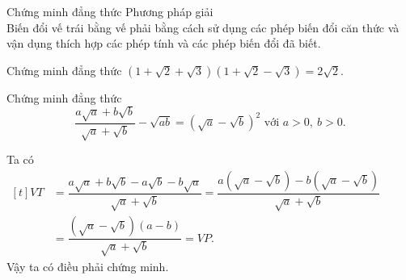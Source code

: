 \begin{dang}{Chứng minh đẳng thức}
    Phương pháp giải\\
   Biến đổi vế trái bằng vế phải bằng cách sử dụng các phép biến đổi căn thức và vận dụng thích hợp các phép tính và các phép biến đổi đã biết.
\end{dang}
\begin{vd}
	Chứng minh đẳng thức $ \left(1+ \sqrt2 + \sqrt 3\right)\left(1+ \sqrt 2 - \sqrt 3\right) = 2\sqrt2. $
\end{vd}
\begin{vd} Chứng minh đẳng thức
	$$\dfrac{a\sqrt a + b\sqrt b}{\sqrt a + \sqrt b} - \sqrt{ab} = (\sqrt a - \sqrt b)^2 \text{ với } a> 0,\ b> 0.$$
	
\end{vd}
\loigiai
	{
		Ta có 
		$\begin{aligned}[t] VT  &= \dfrac{a\sqrt a + b\sqrt b - a\sqrt b - b\sqrt a}{\sqrt a + \sqrt b} = \dfrac{a(\sqrt a - \sqrt b) -b (\sqrt a - \sqrt b)}{\sqrt a+ \sqrt b} \\
		&= \dfrac{(\sqrt a - \sqrt b)(a-b)}{\sqrt a + \sqrt b} = VP. \end{aligned}$\\
		Vậy ta có điều phải chứng minh.
	}

